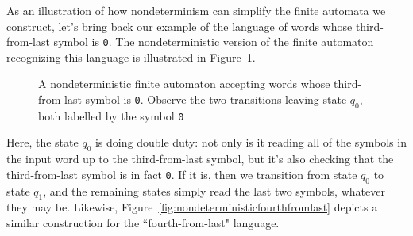 As an illustration of how nondeterminism can simplify the finite automata we construct, let's bring back our example of the language of words whose third-from-last symbol is \texttt{0}. The nondeterministic version of the finite automaton recognizing this language is illustrated in Figure~\ref{fig:nondeterministicthirdfromlast}.
\begin{figure}
\centering
{}
\caption{A nondeterministic finite automaton accepting words whose third-from-last symbol is \texttt{0}. Observe the two transitions leaving state $q_{0}$, both labelled by the symbol \texttt{0}}
\label{fig:nondeterministicthirdfromlast}
\end{figure}
Here, the state $q_{0}$ is doing double duty: not only is it reading all of the symbols in the input word up to the third-from-last symbol, but it's also checking that the third-from-last symbol is in fact \texttt{0}. If it is, then we transition from state $q_{0}$ to state $q_{1}$, and the remaining states simply read the last two symbols, whatever they may be. Likewise, Figure~\ref{fig:nondeterministicfourthfromlast} depicts a similar construction for the ``fourth-from-last" language.
